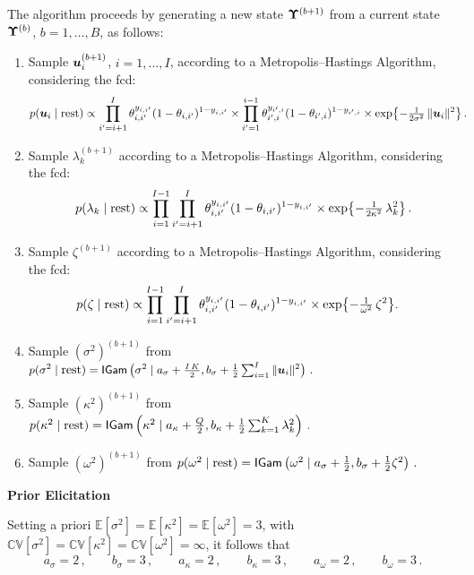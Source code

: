 \documentclass[letterpaper,12pt,openany]{article}
\def\exp#1{{\rm exp}{#1}}
\def\le{\left}
\def\ri{\right}
\def\prop{\propto}
\newcommand{\expec}[1]{\mathbb{E}\left[#1\right]}
\newcommand{\CV}[1]{\mathbb{C}\mathbb{V}\left[#1\right]}
\newcommand{\ex}[1]{\exp{ \left\{ #1 \right\}}}
\def\IGamd{\small{\mathsf{IGam}}}
\def\rest{\text{rest}}
\def\si{\sigma}\def\siv{\boldsymbol{\sigma}}
\def\sig{\sigma}\def\sigv{\boldsymbol{\sigma}}
\def\ome{\omega}
\def\kap{\kappa}
\begin{document}
The algorithm proceeds by generating a new state $\mathbf{\Upsilon}^{(b+1)}$ from a current state $\mathbf{\Upsilon}^{(b)}$, $b=1,\ldots,B$, as follows:
\begin{enumerate}
	\item Sample $\boldsymbol{u}_i^{(b+1)}$, $i=1,\ldots,I$, according to a Metropolis--Hastings Algorithm, considering the fcd:
	\begin{align*}
	p(\uv_i\mid\rest)
	&\propto\prod_{i'=i+1}^I \theta_{i,i'}^{y_{i,i'}}(1-\theta_{i,i'})^{1-y_{i,i'}}\times
	\prod_{i'=1}^{i-1} \theta_{i',i}^{y_{i',i}}(1-\theta_{i',i})^{1-y_{i',i}} \times\ex{-\tfrac{1}{2\sig^2}\,\|\uv_i\|^2}\,.
	\end{align*}
	
	\item Sample $\lambda_k^{(b+1)}$ according to a Metropolis--Hastings Algorithm, considering the fcd:
	$$
	p(\lambda_k\mid\rest) \prop \prod_{i=1}^{I-1}\prod_{i'=i+1}^I\theta_{i,i'}^{y_{i,i'}}(1-\theta_{i,i'})^{1-y_{i,i'}}\times \ex{-\tfrac{1}{2\kap^2}\,\lambda_k^2}\,.
	$$
	\item Sample $\zeta^{(b+1)}$ according to a Metropolis--Hastings Algorithm, considering the fcd:
	\begin{align*}
	p(\zeta\mid\rest)
	&\propto
	\prod_{i=1}^{I-1}\prod_{i'=i+1}^I \theta_{i,i'}^{y_{i,i'}}(1-\theta_{i,i'})^{1-y_{i,i'}}\times \ex{-\tfrac{1}{\ome^2}\,\zeta^2}.
	\end{align*}
	
	\item Sample $(\si^2)^{(b+1)}$ from
	$p(\sig^2\mid\rest) = \IGamd\le(\sig^2 \mid a_\sig + \tfrac{I\,K}2, b_\sig + \tfrac12 \textstyle\sum_{i=1}^I\|\uv_i\|^2 \ri)\,.$
	
	\item Sample $(\kap^2)^{(b+1)}$ from
	$p(\kap^2\mid\rest) = \IGamd\le(\kap^2 \mid a_\kap + \tfrac{Q}2, b_\kap + \tfrac12 \textstyle\sum_{k=1}^K\lambda_k^2 \ri)\,.$
	
	\item Sample $(\ome^2)^{(b+1)}$ from
	$p(\ome^2\mid\rest) = \IGamd\le(\ome^2 \mid a_\sig + \tfrac12, b_\sig + \tfrac12 \zeta^2 \ri)\,.$
\end{enumerate}

\textbf{Prior Elicitation}

Setting a priori $\expec{\sigma^2} = \expec{\kappa^2} = \expec{\omega^2} = 3$, with $\CV{\sigma^2} = \CV{\kappa^2} = \CV{\omega^2} = \infty$, it follows that
$$
a_\sig = 2\,,\qquad b_\sig = 3  \,,\qquad 
a_\kap = 2\,,\qquad b_\kap = 3  \,,\qquad
a_\ome = 2\,,\qquad b_\ome = 3\,.
$$
\end{document}
